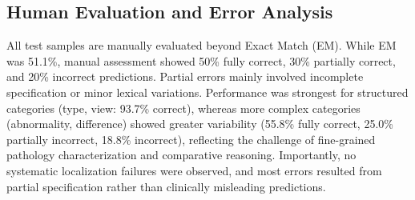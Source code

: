 \subsection{Human Evaluation and Error Analysis}
All test samples are manually evaluated beyond Exact Match (EM). While EM was 51.1\%, manual assessment showed 50\% fully correct, 30\% partially correct, and 20\% incorrect predictions. Partial errors mainly involved incomplete specification or minor lexical variations. Performance was strongest for structured categories (type, view: 93.7\% correct), whereas more complex categories (abnormality, difference) showed greater variability (55.8\% fully correct, 25.0\% partially incorrect, 18.8\% incorrect), reflecting the challenge of fine-grained pathology characterization and comparative reasoning. Importantly, no systematic localization failures were observed, and most errors resulted from partial specification rather than clinically
misleading predictions.

